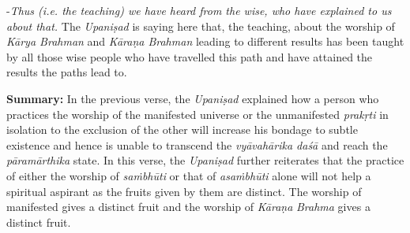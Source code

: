 -\emph{Thus (i.e. the teaching) we have heard from the wise, who have explained to us about that.} The \emph{Upaniṣad} is saying here that, the teaching, about the worship of \emph{Kārya Brahman} and \emph{Kāraṇa Brahman} leading to different results has been taught by all those wise people who have travelled this path and have attained the results the paths lead to.

\textbf{Summary:} In the previous verse, the \emph{Upaniṣad} explained how a person who practices the worship of the manifested universe or the unmanifested \emph{prakṛti} in isolation to the exclusion of the other will increase his bondage to subtle existence and hence is unable to transcend the \emph{vyāvahārika daśā} and reach the \emph{pāramārthika} state. In this verse, the \emph{Upaniṣad} further reiterates that the practice of either the worship of \emph{saṁbhūti} or that of \emph{asaṁbhūti} alone will not help a spiritual aspirant as the fruits given by them are distinct. The worship of manifested gives a distinct fruit and the worship of \emph{Kāraṇa} \emph{Brahma} gives a distinct fruit.


